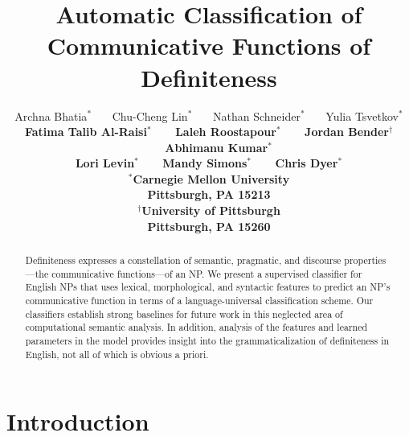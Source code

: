 \documentclass[11pt,letterpaper]{article}
\title{Automatic Classification of Communicative Functions of Definiteness}
\author{Archna Bhatia$^\ast$ \ \ \ Chu-Cheng Lin$^\ast$ \ \ \ Nathan Schneider$^\ast$ \ \ \ Yulia Tsvetkov$^\ast$ \\
 \bf Fatima Talib Al-Raisi$^\ast$ \ \ \  Laleh Roostapour$^\ast$ \ \ \ Jordan Bender$^\dagger$  \ \ \ Abhimanu Kumar$^\ast$  \\
 \bf Lori Levin$^\ast$ \ \ \ Mandy Simons$^\ast$ \ \ \  Chris Dyer$^\ast$\\
$^\ast$Carnegie Mellon University\\
Pittsburgh, PA 15213\\
$^\dagger$University of Pittsburgh\\
Pittsburgh, PA 15260}
\date{}
\newcommand{\ensuretext}[1]{#1}
\newcommand{\abmarker}{\ensuretext{\textcolor{red}{\ensuremath{^{\textsc{A}}_{\textsc{B}}}}}}
\newcommand{\arkcomment}[3]{\ensuretext{\textcolor{#3}{[#1 #2]}}}
\newcommand{\ab}[1]{\arkcomment{\abmarker}{#1}{red}}
\begin{document}
\maketitle
\begin{abstract}
Definiteness expresses a constellation of semantic, pragmatic, and discourse properties---the communicative functions—of an NP. We present a supervised classifier for English NPs that uses lexical, morphological, and syntactic features to predict an NP's communicative function in terms of a language-universal classification scheme. Our classifiers establish strong baselines for future work in this neglected area of computational semantic analysis. In addition, analysis of the features and learned parameters 
in the model provides insight into the grammaticalization of definiteness in English, 
not all of which is obvious a priori.
\end{abstract}

\section{Introduction}
\end{document}
